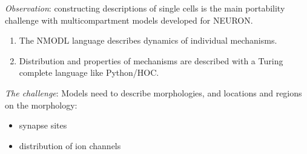 \documentclass[aspectratio=43]{beamer}
\begin{document}


\begin{frame}[fragile]{}
    \emph{Observation}: constructing descriptions of single cells is the main portability
    challenge with multicompartment models developed for NEURON.

    \vspace{10pt}
    \begin{enumerate}
        \item \textcolor{green!50!black}{} The NMODL language describes dynamics of individual mechanisms.
        \item \textcolor{red}{} Distribution and properties of mechanisms are described with a Turing complete language
              like Python/HOC.
    \end{enumerate}
    \vspace{10pt}
    \emph{The challenge}: Models need to describe morphologies, and locations and regions on the morphology:
    \begin{itemize}
        \item synapse sites
        \item distribution of ion channels
    \end{itemize}
\end{frame}
\end{document}
